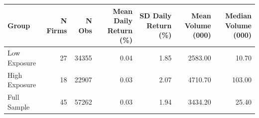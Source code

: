 \begin{tabular}{lrrrrrr}
  \toprule
Group & N Firms & N Obs & Mean Daily Return (\%) & SD Daily Return (\%) & Mean Volume (000) & Median Volume (000) \\
  \midrule
Low Exposure &  27 & 34355 & 0.04 & 1.85 & 2583.00 & 10.70 \\ 
  High Exposure &  18 & 22907 & 0.03 & 2.07 & 4710.70 & 103.00 \\ 
  Full Sample &  45 & 57262 & 0.03 & 1.94 & 3434.20 & 25.40 \\ 
   \bottomrule
\end{tabular}
